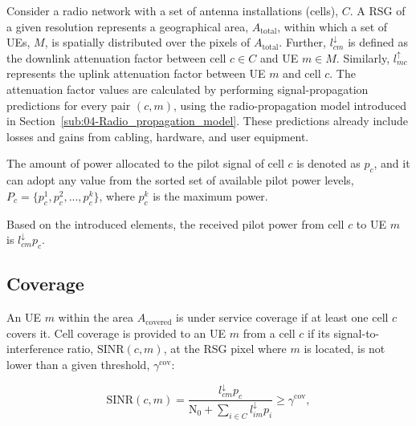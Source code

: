 Consider a radio network with a set of antenna installations (cells),
$C$.
A RSG of a given resolution represents a geographical area, $A_{\mathrm{total}}$,
within which a set of UEs, $M$,
is spatially distributed over the pixels of $A_{\mathrm{total}}$.
Further, $l_{cm}^{\downarrow}$
is defined as the downlink attenuation factor between cell $c\in C$
and UE $m\in M$. Similarly, $l_{mc}^{\uparrow}$
represents the uplink attenuation factor between UE $m$ and cell
$c$. The attenuation factor values are calculated by performing signal-propagation
predictions for every pair $(c,m)$, using the radio-propagation model
introduced in Section~\ref{sub:04-Radio_propagation_model}. These
predictions already include losses and gains from cabling, hardware,
and user equipment.

The amount of power allocated to the pilot signal of cell $c$ is
denoted as $p_{c}$,
and it can adopt any value from the sorted set of available pilot
power levels, $P_{c}=\{p_{c}^{1},p_{c}^{2},...,p_{c}^{k}\}$,
where $p_{c}^{k}$ is the maximum power.

Based on the introduced elements, the received pilot power from cell
$c$ to UE $m$ is $l_{cm}^{\downarrow}p_{c}$.


\subsection{Coverage}

An UE $m$ within the area $A_{\mathrm{covered}}$ is under service
coverage if at least one cell $c$ covers it. Cell coverage is provided
to an UE $m$ from a cell $c$ if its signal-to-interference ratio,
$\mathrm{SINR}(c,m)$,
at the RSG pixel where $m$ is located, is not lower than a given
threshold, $\gamma^{\mathrm{cov}}$:

\begin{equation}
\mathrm{SINR}(c,m)=\frac{l_{cm}^{\downarrow}p_{c}}{\mathrm{N}_{0}+\sum_{i\in C}l_{im}^{\downarrow}p_{i}}\ge\gamma^{\mathrm{cov}},\label{eq:06-Signal_to_interference_ratio}
\end{equation}


